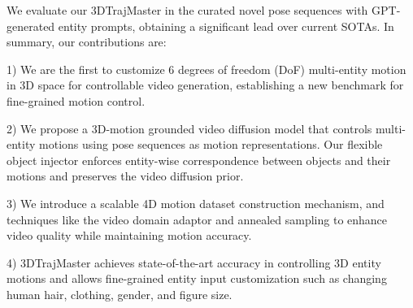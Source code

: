 We evaluate our 3DTrajMaster in the curated novel pose sequences with GPT-generated entity prompts, obtaining a significant lead over current SOTAs. In summary, our contributions are:

1) We are the first to customize 6 degrees of freedom (DoF) multi-entity motion in 3D space for controllable video generation, establishing a new benchmark for fine-grained motion control.

2) We propose a 3D-motion grounded video diffusion model that controls multi-entity motions using pose sequences as motion representations. Our flexible object injector enforces entity-wise correspondence between objects and their motions and preserves the video diffusion prior.

3) We introduce a scalable 4D motion dataset construction mechanism, and techniques like the video domain adaptor and annealed sampling to enhance video quality while maintaining motion accuracy.

4) 3DTrajMaster achieves state-of-the-art accuracy in controlling 3D entity motions and allows fine-grained entity input customization such as changing human hair, clothing, gender, and figure size.
